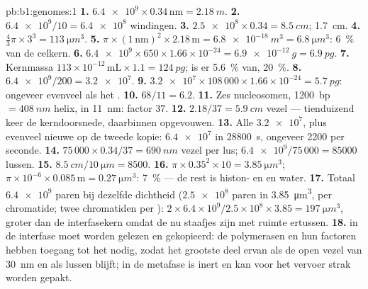 \begin{solution}{pb:b1:genomes:1}
\textbf{1.} $\num{6.4e9}\times 0.34\,\mathrm{nm} = \qty{2.18}{m}$.
\textbf{2.} $\num{6.4e9}/10 = \num{6.4e8}$ windingen.
\textbf{3.} $\num{2.5e8}\times 0.34 = \qty{8.5}{cm}$; \qty{1.7}{cm}.
\textbf{4.} $\frac{4}{3}\pi\times 3^3 = \qty{113}{\micro m^3}$.
\textbf{5.} $\pi\times(1\,\mathrm{nm})^2\times 2.18\,\mathrm{m} =
\qty{6.8e-18}{m^3} = \qty{6.8}{\micro m^3}$: \qty{6}{\%} van de celkern.
\textbf{6.} $\num{6.4e9}\times 650\times 1.66\times 10^{-24} =
\qty{6.9e-12}{g} = \qty{6.9}{pg}$.
\textbf{7.} Kernmassa $113\times 10^{-12}\,\mathrm{mL}\times 1.1 =
\qty{124}{pg}$;  is er \qty{5.6}{\%} van,  \qty{20}{\%}.
\textbf{8.} $\num{6.4e9}/200 = \num{3.2e7}$.
\textbf{9.} $\num{3.2e7}\times 108\,000\times 1.66\times 10^{-24} =
\qty{5.7}{pg}$: ongeveer evenveel als het .
\textbf{10.} $68/11 = 6.2$.
\textbf{11.} Zes nucleosomen, \qty{1200}{bp} $= \qty{408}{nm}$ helix, in
\qty{11}{nm}: factor $37$.
\textbf{12.} $2.18/37 = \qty{5.9}{cm}$ vezel --- tienduizend keer de
kerndoorsnede, daarbinnen opgevouwen.
\textbf{13.} Alle $\num{3.2e7}$, plus evenveel nieuwe op de tweede kopie:
$\num{6.4e7}$ in \qty{28800}{s}, ongeveer \num{2200} per seconde.
\textbf{14.} $75\,000\times 0.34/37 = \qty{690}{nm}$ vezel per lus;
$\num{6.4e9}/75\,000 = \num{85000}$ lussen.
\textbf{15.} $\qty{8.5}{cm}/\qty{10}{\micro m} = 8500$.
\textbf{16.} $\pi\times 0.35^2\times 10 = \qty{3.85}{\micro m^3}$; 
$\pi\times 10^{-6}\times 0.085\,\mathrm{m} = \qty{0.27}{\micro m^3}$:
\qty{7}{\%} --- de rest is histon- en  en water.
\textbf{17.} Totaal  $\num{6.4e9}$ paren bij dezelfde dichtheid
($\num{2.5e8}$ paren in \qty{3.85}{\micro m^3}, per chromatide; twee chromatiden
per ): $2\times 6.4\times 10^9/2.5\times 10^8\times
3.85 = \qty{197}{\micro m^3}$, groter dan de interfasekern omdat de  nu
staafjes zijn met ruimte ertussen.
\textbf{18.}  in de interfase moet worden gelezen en gekopieerd: de
polymerasen en hun factoren hebben toegang tot het  nodig, zodat het grootste
deel ervan als de open vezel van \qty{30}{nm} en als lussen blijft;  in
de metafase is inert en kan voor het vervoer strak worden gepakt.

\end{solution}
